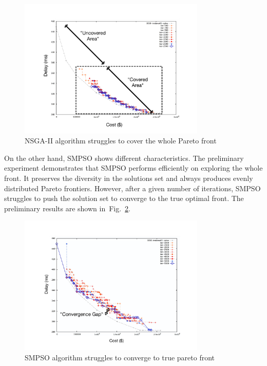 \documentclass[10pt,journal,compsoc]{IEEEtran}
\newcommand{\Fig}[1]{Fig.~\ref{#1}}
\begin{document}
\begin{figure}[ht]
\centerline{\includegraphics[page=1,width=3.5in]{nsgaitertest_label.pdf}}
\caption{NSGA-II algorithm struggles to cover the whole Pareto front} 
\label{nsgalabel}
\end{figure} 

On the other hand, SMPSO shows different characteristics. The preliminary experiment demonstrates that SMPSO performs efficiently on exploring the whole front. It preserves the diversity in the solutions set and always produces evenly distributed Pareto frontiers. However, after a given number of iterations, SMPSO struggles to push the solution set to converge to the true optimal front. The preliminary results are shown in~\Fig{smpsolabel}.

\begin{figure}[ht]
\centerline{\includegraphics[page=1,width=3.5in]{SMPSO_iterationtest_label.pdf}}
\caption{SMPSO algorithm struggles to converge to true pareto front} 
\label{smpsolabel}
\end{figure}
\end{document}
